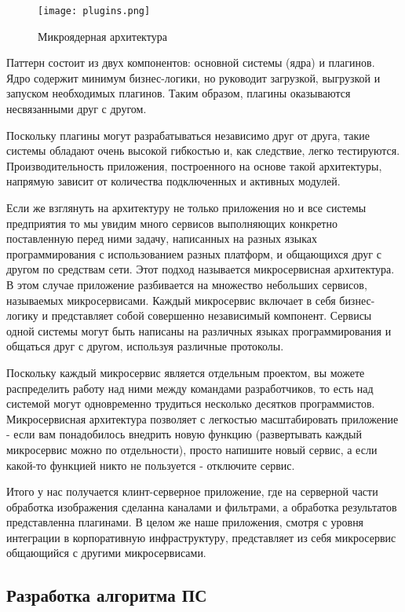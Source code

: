 \begin{figure}[ht] 
    \centering
    \texttt{[image: plugins.png]}  
    \caption{Микроядерная архитектура}
    \label{fig:arch_arch:plugins}
\end{figure}

Паттерн состоит из двух компонентов: основной системы (ядра) и плагинов. Ядро содержит минимум бизнес-логики, но руководит загрузкой, выгрузкой и запуском необходимых плагинов. Таким образом, плагины оказываются несвязанными друг с другом.

Поскольку плагины могут разрабатываться независимо друг от друга, такие системы обладают очень высокой гибкостью и, как следствие, легко тестируются. Производительность приложения, построенного на основе такой архитектуры, напрямую зависит от количества подключенных и активных модулей.

Если же взглянуть на архитектуру не только приложения но и все системы предприятия то мы увидим много сервисов выполняющих конкретно поставленную перед ними задачу, написанных на разных языках программирования с использованием разных платформ, и общающихся друг с другом по средствам сети. Этот подход называется микросервисная архитектура. В этом случае приложение разбивается на множество небольших сервисов, называемых микросервисами. Каждый микросервис включает в себя бизнес-логику и представляет собой совершенно независимый компонент. Сервисы одной системы могут быть написаны на различных языках программирования и общаться друг с другом, используя различные протоколы.

Поскольку каждый микросервис является отдельным проектом, вы можете распределить работу над ними между командами разработчиков, то есть над системой могут одновременно трудиться несколько десятков программистов. Микросервисная архитектура позволяет с легкостью масштабировать приложение - если вам понадобилось внедрить новую функцию (развертывать каждый микросервис можно по отдельности), просто напишите новый сервис, а если какой-то функцией никто не пользуется - отключите сервис.

Итого у нас получается клинт-серверное приложение, где на серверной части обработка изображения сделанна каналами и фильтрами, а обработка результатов представленна плагинами. В целом же наше приложения, смотря с уровня интеграции в корпоративную инфраструктуру, представляет из себя микросервис общающийся с другими микросервисами.

\subsection{Разработка  алгоритма ПС}
\label{sec:arch:algorythm}

